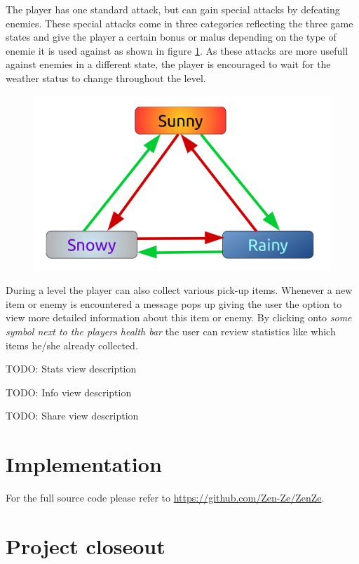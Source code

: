 \documentclass{sigchi}
\begin{document}
The player has one standard attack, but can gain special attacks by defeating enemies. These special attacks come in three categories reflecting the three game states and give the player a certain bonus or malus depending on the type of enemie it is used against as shown in figure \ref{fig:attacks}. As these attacks are more usefull against enemies in a different state, the player is encouraged to wait for the weather status to change throughout the level.

\begin{figure}
\label{fig:attacks}
	\centering
	\includegraphics[width=0.9\columnwidth]{figures/attacks.png}
\end{figure}

During a level the player can also collect various pick-up items. Whenever a new item or enemy is encountered a message pops up giving the user the option to view more detailed information about this item or enemy. By clicking onto \textit{some symbol next to the players health bar} the user can review statistics like which items he/she already collected.

TODO: Stats view description

TODO: Info view description

TODO: Share view description

\section{Implementation}
For the full source code please refer to \url{https://github.com/Zen-Ze/ZenZe}.
\section{Project closeout}
\end{document}
